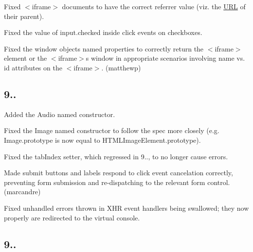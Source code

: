 \begin{DoxyItemize}
\item Fixed {\ttfamily $<$iframe$>$} documents to have the correct {\ttfamily referrer} value (viz. the \mbox{\hyperlink{namespace_u_r_l}{U\+RL}} of their parent).
\item Fixed the value of {\ttfamily input.\+checked} inside {\ttfamily click} events on checkboxes.
\item Fixed the window object\textquotesingle{}s named properties to correctly return the {\ttfamily $<$iframe$>$} element or the {\ttfamily $<$iframe$>$}\textquotesingle{}s window in appropriate scenarios involving {\ttfamily name} vs. {\ttfamily id} attributes on the {\ttfamily $<$iframe$>$}. (matthewp)
\end{DoxyItemize}

\subsection*{9..}


\begin{DoxyItemize}
\item Added the {\ttfamily Audio} named constructor.
\item Fixed the {\ttfamily Image} named constructor to follow the spec more closely (e.\+g. {\ttfamily Image.\+prototype} is now equal to {\ttfamily H\+T\+M\+L\+Image\+Element.\+prototype}).
\item Fixed the {\ttfamily tab\+Index} setter, which regressed in 9.., to no longer cause errors.
\item Made submit buttons and labels respond to click event cancelation correctly, preventing form submission and re-\/dispatching to the relevant form control. (marcandre)
\item Fixed unhandled errors thrown in X\+HR event handlers being swallowed; they now properly are redirected to the virtual console.
\end{DoxyItemize}

\subsection*{9..}


